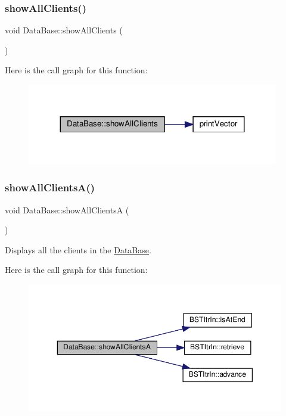 \subsubsection{\texorpdfstring{show\+All\+Clients()}{showAllClients()}}
{\footnotesize\ttfamily void Data\+Base\+::show\+All\+Clients (\begin{DoxyParamCaption}{ }\end{DoxyParamCaption})}

Here is the call graph for this function\+:\nopagebreak
\begin{figure}[H]
\begin{center}
\leavevmode
\includegraphics[width=311pt]{classDataBase_af4762294e1b25415f7de88f0e8d6d90f_cgraph}
\end{center}
\end{figure}
\mbox{\label{classDataBase_a0c83992321a456f8fa097ea5bbf4a093}} 
\subsubsection{\texorpdfstring{show\+All\+Clients\+A()}{showAllClientsA()}}
{\footnotesize\ttfamily void Data\+Base\+::show\+All\+ClientsA (\begin{DoxyParamCaption}{ }\end{DoxyParamCaption})}



Displays all the clients in the \hyperlink{classDataBase}{Data\+Base}. 

Here is the call graph for this function\+:\nopagebreak
\begin{figure}[H]
\begin{center}
\leavevmode
\includegraphics[width=350pt]{classDataBase_a0c83992321a456f8fa097ea5bbf4a093_cgraph}
\end{center}
\end{figure}
\mbox{\label{classDataBase_ab00290f55389cd62d8ee5594ecf9a6b5}} 
